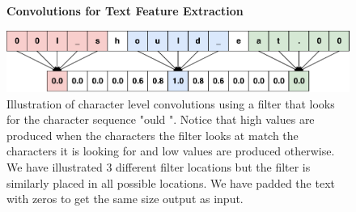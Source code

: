 \begin{figure}
    \centering
    \textbf{Convolutions for Text Feature Extraction}\par\medskip
    \includegraphics[width=\textwidth]{./pictures/experiments/convolution_example}
    \caption{Illustration of character level convolutions using a filter that
        looks for the character sequence "ould ". Notice that high values are
        produced when the characters the filter looks at match the characters it
        is looking for and low values are produced otherwise. We have
        illustrated 3 different filter locations but the filter is similarly
        placed in all possible locations. We have padded the text with zeros to
        get the same size output as input.}
    \label{fig:convolution_text_example}
\end{figure}

